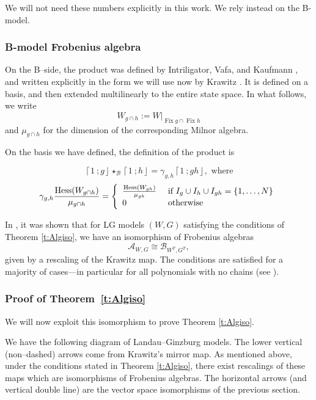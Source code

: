 \documentclass[10pt, letterpaper]{amsart}
\theoremstyle{remark}
\newcommand{\sA}{\mathscr{A}}
\newcommand{\sB}{\mathscr{B}}
\newcommand{\fjrw}[2]{ \left\lceil #1 \:; #2 \right\rfloor }
\DeclareMathOperator{\Hess}{Hess}
\DeclareMathOperator{\Fix}{Fix}
\begin{document}
We will not need these numbers explicitly in this work. We rely instead on the B-model. 


\subsubsection{B-model Frobenius algebra}
On the B--side, the product was defined by Intriligator, Vafa, and Kaufmann \cite{IV, kau1,kau2,kau3}, and written explicitly in the form we will use now by Krawitz \cite{Kr}. It is defined on a basis, and then extended multilinearly to the entire state space. In what follows, we write 
\[
W_{g\cap h}:= W|_{\Fix g \cap \Fix h}
\]
and $\mu_{g\cap h}$ for the dimension of the corresponding Milnor algebra. 

On the basis we have defined, the definition of the product is 

\[
\fjrw{1}{g}\star_{\sB} \fjrw{1}{h} = \gamma_{g,h} \fjrw{1}{gh}, \text{ where}
\]
\[
\gamma_{g,h} \frac{\Hess (W_{g\cap h})}{\mu_{g\cap h}} = \left\{ \begin{array}{l l }
\frac{\Hess (W_{gh})}{\mu_{gh}} & \text{ if } I_g \cup I_h \cup I_{gh} = \{1, \ldots, N\}\\
0 & \text{ otherwise} \\ \end{array}\right.
\]

In \cite{FJJS}, it was shown that for LG models $(W,G)$ satisfying the conditions of Theorem \ref{t:Algiso}, we have an isomorphism of Frobenius algebras
\[
\sA_{W,G}\cong \sB_{W^T,G^T}, 
\]
given by a rescaling of the Krawitz map. 
The conditions are satisfied for a majority of cases---in particular for all polynomials with no chains (see \cite[Remark 1.1.1]{FJJS}). 


\subsubsection{Proof of Theorem~\ref{t:Algiso}}We will now exploit this isomorphism to prove Theorem \ref{t:Algiso}. 

We have the following diagram of Landau--Ginzburg models. The lower vertical (non--dashed) arrows come from Krawitz's mirror map. As mentioned above, under the conditions stated in Theorem \ref{t:Algiso}, there exist rescalings of these maps which are isomorphisms of Frobenius algebras. The horizontal arrows (and vertical double line) are the vector space isomorphisms of the previous section.   
\end{document}

